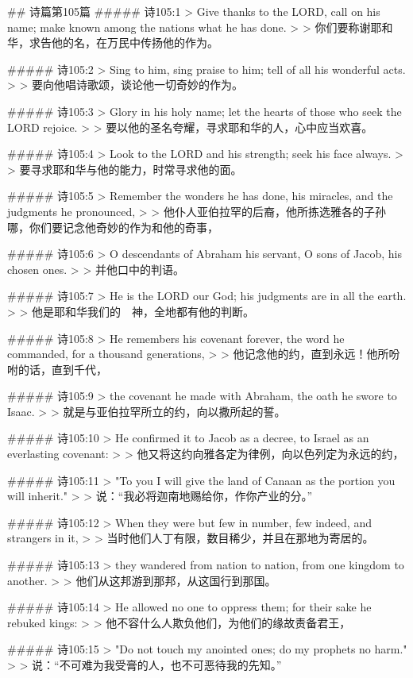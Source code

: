 ## 诗篇第105篇
##### 诗105:1
> Give thanks to the LORD, call on his name; make known among the nations what he has done.
>
> 你们要称谢耶和华，求告他的名，在万民中传扬他的作为。


##### 诗105:2
> Sing to him, sing praise to him; tell of all his wonderful acts.
>
> 要向他唱诗歌颂，谈论他一切奇妙的作为。


##### 诗105:3
> Glory in his holy name; let the hearts of those who seek the LORD rejoice.
>
> 要以他的圣名夸耀，寻求耶和华的人，心中应当欢喜。


##### 诗105:4
> Look to the LORD and his strength; seek his face always.
>
> 要寻求耶和华与他的能力，时常寻求他的面。


##### 诗105:5
> Remember the wonders he has done, his miracles, and the judgments he pronounced,
>
> 他仆人亚伯拉罕的后裔，他所拣选雅各的子孙哪，你们要记念他奇妙的作为和他的奇事，


##### 诗105:6
> O descendants of Abraham his servant, O sons of Jacob, his chosen ones.
>
> 并他口中的判语。


##### 诗105:7
> He is the LORD our God; his judgments are in all the earth.
>
> 他是耶和华我们的　神，全地都有他的判断。


##### 诗105:8
> He remembers his covenant forever, the word he commanded, for a thousand generations,
>
> 他记念他的约，直到永远！他所吩咐的话，直到千代，


##### 诗105:9
> the covenant he made with Abraham, the oath he swore to Isaac.
>
> 就是与亚伯拉罕所立的约，向以撒所起的誓。


##### 诗105:10
> He confirmed it to Jacob as a decree, to Israel as an everlasting covenant:
>
> 他又将这约向雅各定为律例，向以色列定为永远的约，


##### 诗105:11
> "To you I will give the land of Canaan as the portion you will inherit."
>
> 说：“我必将迦南地赐给你，作你产业的分。”


##### 诗105:12
> When they were but few in number, few indeed, and strangers in it,
>
> 当时他们人丁有限，数目稀少，并且在那地为寄居的。


##### 诗105:13
> they wandered from nation to nation, from one kingdom to another.
>
> 他们从这邦游到那邦，从这国行到那国。


##### 诗105:14
> He allowed no one to oppress them; for their sake he rebuked kings:
>
> 他不容什么人欺负他们，为他们的缘故责备君王，


##### 诗105:15
> "Do not touch my anointed ones; do my prophets no harm."
>
> 说：“不可难为我受膏的人，也不可恶待我的先知。”


